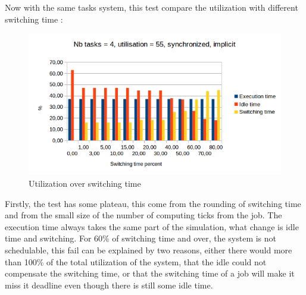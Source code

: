 \documentclass[a4paper,12pt]{article}
\begin{document}
Now with the same tasks system, this test compare the utilization with different switching time :
\begin{figure}[H]
	\begin{center}
		\includegraphics[scale=1]{switchingtime.png}
	\end{center}
	\label{us}
	\caption{Utilization over switching time}
\end{figure}

Firstly, the test has some plateau, this come from the rounding of switching time and from the small size of the number of computing ticks from the job. The execution time always takes the same part of the simulation, what change is idle time and switching. For 60\% of switching time and over, the system is not schedulable, this fail can be explained by two reasons, either there would more than 100\% of the total utilization of the system, that the idle could not compensate the switching time, or that the switching time of a job will make it miss it deadline even though there is still some idle time.
\end{document}
